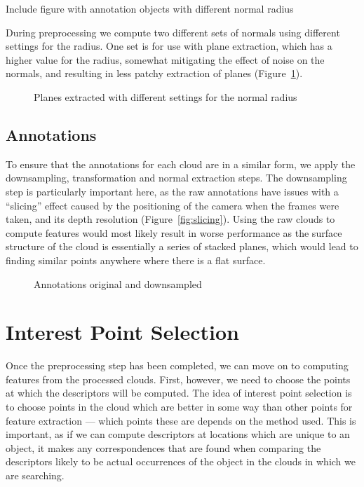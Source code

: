 \documentclass[11pt,a4paper]{kth-mag}
\begin{document}
Include figure with annotation objects with different normal radius

During preprocessing we compute two different sets of normals using different
settings for the radius. One set is for use with plane extraction, which has a
higher value for the radius, somewhat mitigating the effect of noise on the
normals, and resulting in less patchy extraction of planes
(Figure~\ref{fig:plane_normrad}).

\begin{figure}
  \centering
  
  \caption{Planes extracted with different settings for the normal radius}
  \label{fig:plane_normrad}
\end{figure}

\subsection{Annotations}
To ensure that the annotations for each cloud are in a similar form, we apply
the downsampling, transformation and normal extraction steps. The downsampling
step is particularly important here, as the raw annotations have issues with a
``slicing'' effect caused by the positioning of the camera when the frames were
taken, and its depth resolution (Figure~\ref{fig:slicing}). Using the raw clouds
to compute features would most likely result in worse performance as the surface
structure of the cloud is essentially a series of stacked planes, which would
lead to finding similar points anywhere where there is a flat surface.

\begin{figure}
  \centering
  \caption{Annotations original and downsampled}
  \label{fig:annotation_ds}
\end{figure}
\section{Interest Point Selection}
Once the preprocessing step has been completed, we can move on to computing
features from the processed clouds. First, however, we need to choose the points
at which the descriptors will be computed. The idea of interest point selection
is to choose points in the cloud which are better in some way than other points
for feature extraction --- which points these are depends on the method used.
This is important, as if we can compute descriptors at locations which are
unique to an object, it makes any correspondences that are found when comparing
the descriptors likely to be actual occurrences of the object in the clouds in
which we are searching.
\end{document}
